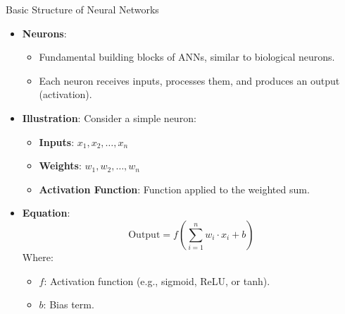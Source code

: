 \documentclass[aspectratio=169]{beamer}
\begin{document}
\begin{frame}[fragile]{Basic Structure of Neural Networks}
  \begin{itemize}
    \item \textbf{Neurons}:
    \begin{itemize}
      \item Fundamental building blocks of ANNs, similar to biological neurons.
      \item Each neuron receives inputs, processes them, and produces an output (activation).
    \end{itemize}
    
    \item \textbf{Illustration}: Consider a simple neuron:
    \begin{itemize}
      \item \textbf{Inputs}: \( x_1, x_2, \ldots, x_n \)
      \item \textbf{Weights}: \( w_1, w_2, \ldots, w_n \)
      \item \textbf{Activation Function}: Function applied to the weighted sum.
    \end{itemize}
    
    \item \textbf{Equation}:
    \begin{equation}
      \text{Output} = f\left(\sum_{i=1}^{n} w_i \cdot x_i + b\right)
    \end{equation}
    Where:
    \begin{itemize}
      \item \( f \): Activation function (e.g., sigmoid, ReLU, or tanh).
      \item \( b \): Bias term.
    \end{itemize}
  \end{itemize}
\end{frame}
\end{document}
